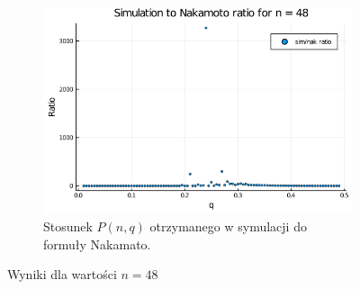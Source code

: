 \documentclass{article}
\begin{document}
\begin{figure}[H]
            \begin{subfigure}{0.65\textwidth}
                \includegraphics[width=\linewidth]{img/mc_to_na_n=48.png}
                \caption{Stosunek $P(n,q)$ otrzymanego w symulacji do formuły Nakamato.}
            \end{subfigure}
    
            \caption{Wyniki dla wartości $n = 48$}
        \end{figure}

        
    
\end{document}
